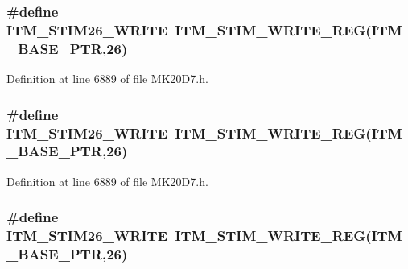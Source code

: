 \subsubsection[{\texorpdfstring{I\+T\+M\+\_\+\+S\+T\+I\+M26\+\_\+\+W\+R\+I\+TE}{ITM_STIM26_WRITE}}]{\setlength{\rightskip}{0pt plus 5cm}\#define I\+T\+M\+\_\+\+S\+T\+I\+M26\+\_\+\+W\+R\+I\+TE~{\bf I\+T\+M\+\_\+\+S\+T\+I\+M\+\_\+\+W\+R\+I\+T\+E\+\_\+\+R\+EG}({\bf I\+T\+M\+\_\+\+B\+A\+S\+E\+\_\+\+P\+TR},26)}\hypertarget{group___i_t_m___register___accessor___macros_ga56f074bfff0348baad454e7fba80c007}{}\label{group___i_t_m___register___accessor___macros_ga56f074bfff0348baad454e7fba80c007}


Definition at line 6889 of file M\+K20\+D7.\+h.

\subsubsection[{\texorpdfstring{I\+T\+M\+\_\+\+S\+T\+I\+M26\+\_\+\+W\+R\+I\+TE}{ITM_STIM26_WRITE}}]{\setlength{\rightskip}{0pt plus 5cm}\#define I\+T\+M\+\_\+\+S\+T\+I\+M26\+\_\+\+W\+R\+I\+TE~{\bf I\+T\+M\+\_\+\+S\+T\+I\+M\+\_\+\+W\+R\+I\+T\+E\+\_\+\+R\+EG}({\bf I\+T\+M\+\_\+\+B\+A\+S\+E\+\_\+\+P\+TR},26)}\hypertarget{group___i_t_m___register___accessor___macros_ga56f074bfff0348baad454e7fba80c007}{}\label{group___i_t_m___register___accessor___macros_ga56f074bfff0348baad454e7fba80c007}


Definition at line 6889 of file M\+K20\+D7.\+h.

\subsubsection[{\texorpdfstring{I\+T\+M\+\_\+\+S\+T\+I\+M26\+\_\+\+W\+R\+I\+TE}{ITM_STIM26_WRITE}}]{\setlength{\rightskip}{0pt plus 5cm}\#define I\+T\+M\+\_\+\+S\+T\+I\+M26\+\_\+\+W\+R\+I\+TE~{\bf I\+T\+M\+\_\+\+S\+T\+I\+M\+\_\+\+W\+R\+I\+T\+E\+\_\+\+R\+EG}({\bf I\+T\+M\+\_\+\+B\+A\+S\+E\+\_\+\+P\+TR},26)}\hypertarget{group___i_t_m___register___accessor___macros_ga56f074bfff0348baad454e7fba80c007}{}\label{group___i_t_m___register___accessor___macros_ga56f074bfff0348baad454e7fba80c007}


